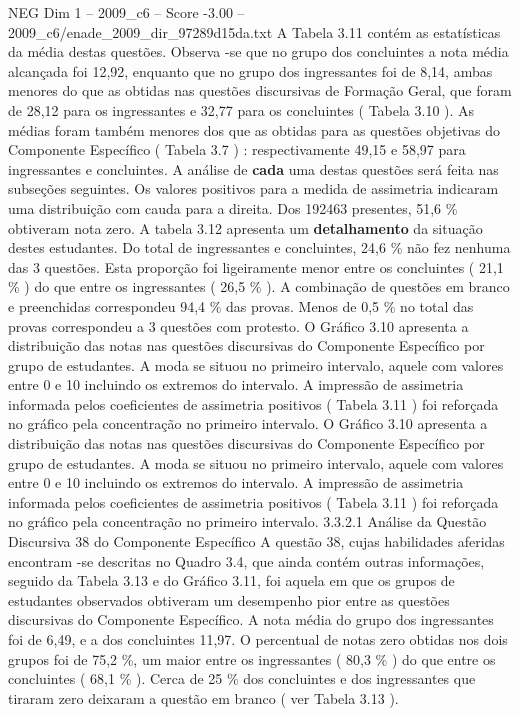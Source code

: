 \begin{textsample}{NEG Dim 1 – 2009\_c6 – Score -3.00 – 2009\_c6/enade\_2009\_dir\_97289d15da.txt}
A Tabela 3.11 contém as estatísticas da média destas questões.
Observa -se que no grupo dos concluintes a nota média alcançada foi 12,92, enquanto que no grupo dos ingressantes foi de 8,14, ambas menores do que as obtidas nas questões discursivas de Formação Geral, que foram de 28,12 para os ingressantes e 32,77 para os concluintes ( Tabela 3.10 ).
As médias foram também menores dos que as obtidas para as questões objetivas do Componente Específico ( Tabela 3.7 ) : respectivamente 49,15 e 58,97 para ingressantes e concluintes.
A análise de \textbf{cada} uma destas questões será feita nas subseções seguintes.
Os valores positivos para a medida de assimetria indicaram uma distribuição com cauda para a direita.
Dos 192463 presentes, 51,6 \% obtiveram nota zero.
A tabela 3.12 apresenta um \textbf{detalhamento} da situação destes estudantes.
Do total de ingressantes e concluintes, 24,6 \% não fez nenhuma das 3 questões.
Esta proporção foi ligeiramente menor entre os concluintes ( 21,1 \% ) do que entre os ingressantes ( 26,5 \% ).
A combinação de questões em branco e preenchidas correspondeu 94,4 \% das provas.
Menos de 0,5 \% no total das provas correspondeu a 3 questões com protesto.
O Gráfico 3.10 apresenta a distribuição das notas nas questões discursivas do Componente Específico por grupo de estudantes.
A moda se situou no primeiro intervalo, aquele com valores entre 0 e 10 incluindo os extremos do intervalo.
A impressão de assimetria informada pelos coeficientes de assimetria positivos ( Tabela 3.11 ) foi reforçada no gráfico pela concentração no primeiro intervalo.
O Gráfico 3.10 apresenta a distribuição das notas nas questões discursivas do Componente Específico por grupo de estudantes.
A moda se situou no primeiro intervalo, aquele com valores entre 0 e 10 incluindo os extremos do intervalo.
A impressão de assimetria informada pelos coeficientes de assimetria positivos ( Tabela 3.11 ) foi reforçada no gráfico pela concentração no primeiro intervalo. 3.3.2.1 Análise da Questão Discursiva 38 do Componente Específico A questão 38, cujas habilidades aferidas encontram -se descritas no Quadro 3.4, que ainda contém outras informações, seguido da Tabela 3.13 e do Gráfico 3.11, foi aquela em que os grupos de estudantes observados obtiveram um desempenho pior entre as questões discursivas do Componente Específico.
A nota média do grupo dos ingressantes foi de 6,49, e a dos concluintes 11,97.
O percentual de notas zero obtidas nos dois grupos foi de 75,2 \%, um maior entre os ingressantes ( 80,3 \% ) do que entre os concluintes ( 68,1 \% ).
Cerca de 25 \% dos concluintes e dos ingressantes que tiraram zero deixaram a questão em branco ( ver Tabela 3.13 ).

\end{textsample}
